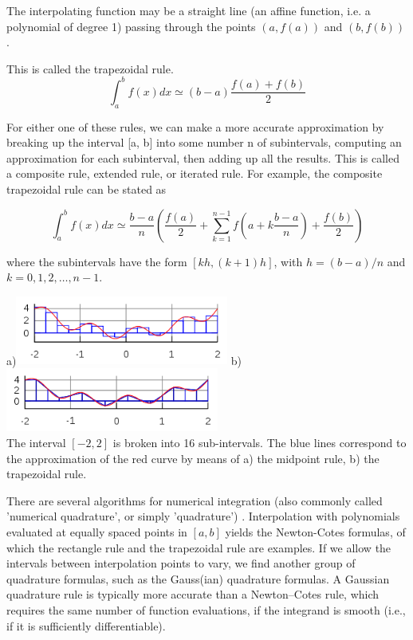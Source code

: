 The interpolating function may be a straight line (an affine function, i.e. a polynomial of degree 1)
passing through the points $(a, f(a))$ and $(b, f(b))$.

This is called the trapezoidal rule.  
\[
\int_a^b f(x)dx \simeq (b-a) \frac{f(a)+f(b)}{2}
\]


For either one of these rules, we can make a more accurate approximation by breaking up the interval [a, b] into some number n of subintervals, computing an approximation for each subinterval, then adding up all the results. This is called a composite rule, extended rule, or iterated rule. For example, the composite trapezoidal rule can be stated as

\[
\int_a^b f(x)dx \simeq \frac{b-a}{n} \left( \frac{f(a)}{2}  
+\sum_{k=1}^{n-1} f(a+k\frac{b-a}{n})
   +\frac{f(b)}{2} \right)
\]

where the subintervals have the form $[kh,(k+1)h]$, with $h=(b-a)/n$ and $k=0,1,2,\dots,n-1$.


\begin{center}
a)\includegraphics[width=7cm]{images/quadrature/int1}
b)\includegraphics[width=7cm]{images/quadrature/int2}\\
The interval $[-2,2]$ is broken into 16 sub-intervals. The blue lines correspond to the 
approximation of the red curve by means of a) the midpoint rule,  b) the trapezoidal rule.
\end{center}

There are several algorithms for numerical integration (also commonly called 'numerical quadrature', or
simply 'quadrature') .
Interpolation with polynomials evaluated at equally spaced points in $[a,b]$
yields the Newton-Cotes formulas, of which the rectangle rule and the trapezoidal rule are examples. 
If we allow the intervals between interpolation points to vary, we find another group of quadrature formulas, such as 
the Gauss(ian) quadrature formulas. 
A Gaussian quadrature rule is typically more accurate than a Newton–Cotes rule, 
which requires the same number of function evaluations, if the integrand is smooth 
(i.e., if it is sufficiently differentiable).


